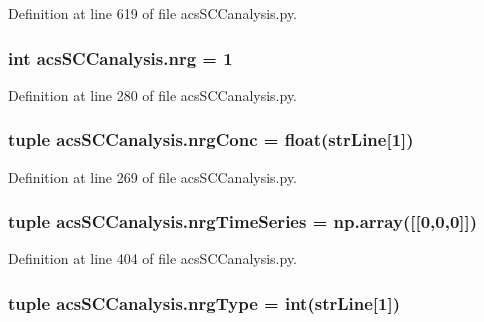 Definition at line 619 of file acs\+S\+C\+Canalysis.\+py.

\hypertarget{a00130_a948683f966c62ac856582281c3cda1f4}{
\subsubsection[{nrg}]{\setlength{\rightskip}{0pt plus 5cm}int acs\+S\+C\+Canalysis.\+nrg = 1}}\label{a00130_a948683f966c62ac856582281c3cda1f4}


Definition at line 280 of file acs\+S\+C\+Canalysis.\+py.

\hypertarget{a00130_a24d5f5a61d56c596017396ad272ef4a4}{
\subsubsection[{nrg\+Conc}]{\setlength{\rightskip}{0pt plus 5cm}tuple acs\+S\+C\+Canalysis.\+nrg\+Conc = float({\bf str\+Line}\mbox{[}1\mbox{]})}}\label{a00130_a24d5f5a61d56c596017396ad272ef4a4}


Definition at line 269 of file acs\+S\+C\+Canalysis.\+py.

\hypertarget{a00130_ad4d4abc783f2f7f8d1084b1144b4fe2f}{
\subsubsection[{nrg\+Time\+Series}]{\setlength{\rightskip}{0pt plus 5cm}tuple acs\+S\+C\+Canalysis.\+nrg\+Time\+Series = np.\+array(\mbox{[}\mbox{[}0,0,0\mbox{]}\mbox{]})}}\label{a00130_ad4d4abc783f2f7f8d1084b1144b4fe2f}


Definition at line 404 of file acs\+S\+C\+Canalysis.\+py.

\hypertarget{a00130_a0d0c83fd90489be59b1f5a31dadf4469}{
\subsubsection[{nrg\+Type}]{\setlength{\rightskip}{0pt plus 5cm}tuple acs\+S\+C\+Canalysis.\+nrg\+Type = int({\bf str\+Line}\mbox{[}1\mbox{]})}}\label{a00130_a0d0c83fd90489be59b1f5a31dadf4469}


